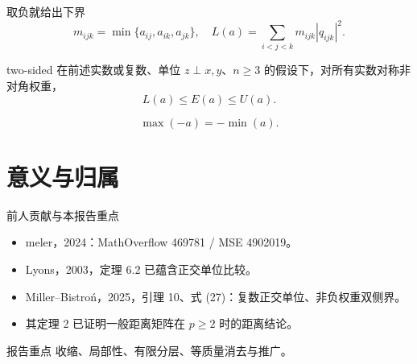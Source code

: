 \documentclass{beamer}
\begin{document}
\begin{frame}{取负就给出下界}
\[
m_{ijk}=\min\{a_{ij},a_{ik},a_{jk}\},
\quad L(a)=\sum_{i<j<k}m_{ijk}|q_{ijk}|^2.
\]
\begin{bookresult}{two-sided}
在前述实数或复数、单位 $z\perp x,y$、$n\ge3$ 的假设下，对所有实数对称非对角权重，
\[
L(a)\le E(a)\le U(a).
\]
\end{bookresult}
\[
\max(-a)=-\min(a).
\]
\end{frame}
\section{意义与归属}
\begin{frame}{前人贡献与本报告重点}
\begin{itemize}
\item meler，2024：MathOverflow 469781 / MSE 4902019。
\item Lyons，2003，定理 6.2 已蕴含正交单位比较。
\item Miller--Bistroń，2025，引理 10、式 (27)：复数正交单位、非负权重双侧界。
\item 其定理 2 已证明一般距离矩阵在 $p\ge2$ 时的距离结论。
\end{itemize}
\begin{block}{报告重点}
收缩、局部性、有限分层、等质量消去与推广。
\end{block}
\end{frame}
\appendix
\end{document}
